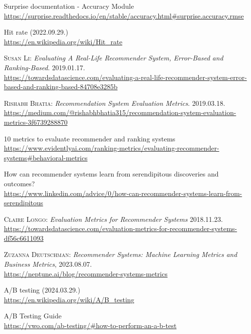 \documentclass[
]{thesis-ekf}
\theoremstyle{definition}
\theoremstyle{remark}
\begin{document}
\begin{thebibliography}{2}
Surprise documentation - Accuracy Module
\\\url{https://surprise.readthedocs.io/en/stable/accuracy.html#surprise.accuracy.rmse}

Hit rate (2022.09.29.)
\\\url{https://en.wikipedia.org/wiki/Hit_rate}

\textsc{Susan Li}: \emph{Evaluating A Real-Life Recommender System, Error-Based and Ranking-Based}. 2019.01.17.
\\\url{https://towardsdatascience.com/evaluating-a-real-life-recommender-system-error-based-and-ranking-based-84708e3285b}

\textsc{Rishabh Bhatia}: \emph{Recommendation System Evaluation Metrics}. 2019.03.18.
\\\url{https://medium.com/@rishabhbhatia315/recommendation-system-evaluation-metrics-3f6739288870}

10 metrics to evaluate recommender and ranking systems
\\\url{https://www.evidentlyai.com/ranking-metrics/evaluating-recommender-systems#behavioral-metrics}

How can recommender systems learn from serendipitous discoveries and outcomes?
\\\url{https://www.linkedin.com/advice/0/how-can-recommender-systems-learn-from-serendipitous}

\textsc{Claire Longo}: \emph{Evaluation Metrics for Recommender Systems} 2018.11.23.
\\\url{https://towardsdatascience.com/evaluation-metrics-for-recommender-systems-df56c6611093}

\textsc{Zuzanna Deutschman}: \emph{Recommender Systems: Machine Learning Metrics and Business Metrics}, 2023.08.07.
\\\url{https://neptune.ai/blog/recommender-systems-metrics}

A/B testing (2024.03.29.)
\\\url{https://en.wikipedia.org/wiki/A/B_testing}

A/B Testing Guide
\\\url{https://vwo.com/ab-testing/#how-to-perform-an-a-b-test}


\end{thebibliography}
\end{document}

